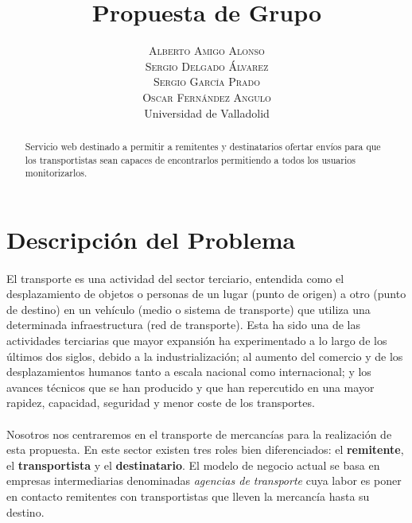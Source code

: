 \documentclass[10pt, a4paper,spanish]{article}
\title{\vspace{-15mm}\fontsize{24pt}{10pt}\selectfont\textbf{Propuesta de Grupo}} %
\author{
\large
\textsc{Alberto Amigo Alonso}\\[2mm] %
\textsc{Sergio Delgado Álvarez}\\[2mm] %
\textsc{Sergio García Prado}\\[2mm] %
\textsc{Oscar Fernández Angulo}\\[2mm] %
\normalsize Universidad de Valladolid \\ %
\vspace{-5mm}
}
\date{}
\begin{document}
	\maketitle %

	\thispagestyle{fancy} %


	\begin{abstract}
		\noindent Servicio web destinado a permitir a remitentes y destinatarios ofertar envíos para que los transportistas sean capaces de encontrarlos permitiendo a todos los usuarios monitorizarlos.
	\end{abstract}


		\section{Descripción del Problema}

			\paragraph{}
			El transporte es una actividad del sector terciario, entendida como el desplazamiento de objetos o personas de un lugar (punto de origen) a otro (punto de destino) en un vehículo (medio o sistema de transporte) que utiliza una determinada infraestructura (red de transporte). Esta ha sido una de las actividades terciarias que mayor expansión ha experimentado a lo largo de los últimos dos siglos, debido a la industrialización; al aumento del comercio y de los desplazamientos humanos tanto a escala nacional como internacional; y los avances técnicos que se han producido y que han repercutido en una mayor rapidez, capacidad, seguridad y menor coste de los transportes. \cite{wikipedia_transporte}

			\paragraph{}
			Nosotros nos centraremos en el transporte de mercancías para la realización de esta propuesta. En este sector existen tres roles bien diferenciados: el \textbf{remitente}, el \textbf{transportista} y el \textbf{destinatario}. El modelo de negocio actual se basa en empresas intermediarias denominadas \textit{agencias de transporte} cuya labor es poner en contacto remitentes con transportistas que lleven la mercancía hasta su destino.
\end{document}
